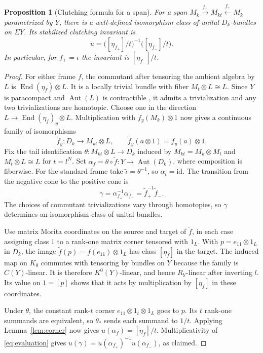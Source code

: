 \documentclass[11pt]{article}
\newtheorem{proposition}[theorem]{Proposition}
\DeclareMathOperator{\Aut}{Aut}
\DeclareMathOperator{\End}{End}
\newcommand{\id}{\mathrm{id}}
\begin{document}
\begin{proposition}[Clutching formula for a span]\label{prop:span}
For a span \(M_k\xrightarrow{f_-}M_{kt}\xleftarrow{f_+}M_k\) parametrized by \(Y\), there is a well-defined isomorphism class of unital \(D_k\)-bundles on \(\Sigma Y\). Its stabilized clutching invariant is
\begin{equation}\label{eq:span}
  u=\bigl([\eta_{f_+}]/t\bigr)^{-1}\bigl([\eta_{f_-}]/t\bigr).
\end{equation}
In particular, for \(f_+=\iota\) the invariant is \([\eta_{f_-}]/t\).
\end{proposition}
\begin{proof}
For either frame \(f\), the commutant after tensoring the ambient algebra by \(L\) is \(\End(\eta_f)\otimes L\). It is a locally trivial bundle with fiber \(M_t\otimes L\cong L\). Since \(Y\) is paracompact and \(\Aut(L)\) is contractible \cite[Theorem 2.3]{DP1}, it admits a trivialization and any two trivializations are homotopic. Choose one in the direction \(L\to\End(\eta_f)_y\otimes L\). Multiplication with \(f_y(M_k)\otimes1\) now gives a continuous family of isomorphisms
\[
 \widetilde f_y:D_k\longrightarrow M_{kt}\otimes L,\qquad
 \widetilde f_y(a\otimes1)=f_y(a)\otimes1 .
\]
Fix the tail identification \(\theta:M_{kt}\otimes L\to D_k\) induced by \(M_{kt}=M_k\otimes M_t\) and \(M_t\otimes L\cong L\) for \(t=l^N\). Set \(\alpha_f=\theta\circ\widetilde f:Y\to\Aut(D_k)\), where composition is fiberwise. For the standard frame take \(\widetilde\iota=\theta^{-1}\), so \(\alpha_\iota=\id\). The transition from the negative cone to the positive cone is
\[
 \gamma=\alpha_{f_+}^{-1}\alpha_{f_-}
        =\widetilde f_+^{-1}\widetilde f_- .
\]
The choices of commutant trivializations vary through homotopies, so \(\gamma\) determines an isomorphism class of unital bundles.

Use matrix Morita coordinates on the source and target of \(\widetilde f\), in each case assigning class \(1\) to a rank-one matrix corner tensored with \(1_L\). With \(p=e_{11}\otimes1_L\) in \(D_k\), the image \(\widetilde f(p)=f(e_{11})\otimes1_L\) has class \([\eta_f]\) in the target. The induced map on \(K_0\) commutes with tensoring by bundles on \(Y\) because the family is \(C(Y)\)-linear. It is therefore \(K^0(Y)\)-linear, and hence \(R_Y\)-linear after inverting \(l\). Its value on \(1=[p]\) shows that it acts by multiplication by \([\eta_f]\) in these coordinates.

Under \(\theta\), the constant rank-\(t\) corner \(e_{11}\otimes1_t\otimes1_L\) goes to \(p\). Its \(t\) rank-one summands are equivalent, so \(\theta_*\) sends each summand to \(1/t\). Applying Lemma~\ref{lem:corner} now gives \(u(\alpha_f)=[\eta_f]/t\). Multiplicativity of \eqref{eq:evaluation} gives \(u(\gamma)=u(\alpha_{f_+})^{-1}u(\alpha_{f_-})\), as claimed.
\end{proof}
\end{document}
